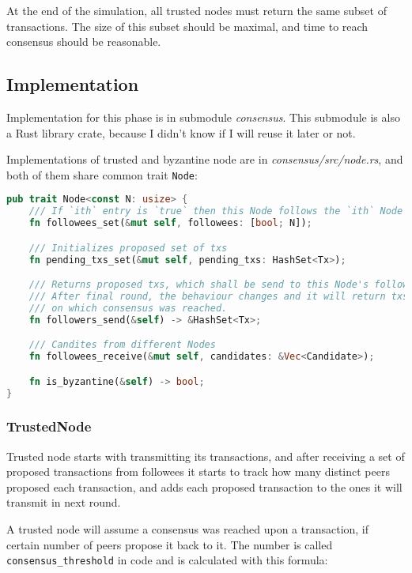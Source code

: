At the end of the simulation, all trusted nodes must return the same subset of
transactions. The size of this subset should be maximal, and time to reach
consensus should be reasonable.

\subsection{Implementation}

Implementation for this phase is in submodule \emph{consensus}. This submodule is
also a Rust library crate, because I didn't know if I will reuse it later or not.

Implementations of trusted and byzantine node are in \emph{consensus/src/node.rs},
and both of them share common trait \texttt{Node}:

\begin{lstlisting}[language=Rust, style=boxed, caption={Node trait}]
pub trait Node<const N: usize> {
    /// If `ith` entry is `true` then this Node follows the `ith` Node
    fn followees_set(&mut self, followees: [bool; N]);

    /// Initializes proposed set of txs
    fn pending_txs_set(&mut self, pending_txs: HashSet<Tx>);

    /// Returns proposed txs, which shall be send to this Node's followers.
    /// After final round, the behaviour changes and it will return txs,
    /// on which consensus was reached.
    fn followers_send(&self) -> &HashSet<Tx>;

    /// Candites from different Nodes
    fn followees_receive(&mut self, candidates: &Vec<Candidate>);

    fn is_byzantine(&self) -> bool;
}
\end{lstlisting}

\subsubsection*{TrustedNode}

Trusted node starts with transmitting its transactions, and after receiving
a set of proposed transactions from followees it starts to track how many
distinct peers proposed each transaction, and adds each proposed transaction
to the ones it will transmit in next round.

A trusted node will assume a consensus was reached upon a transaction, if certain
number of peers propose it back to it. The number is called
\texttt{consensus\_threshold} in code and is calculated with this formula:

